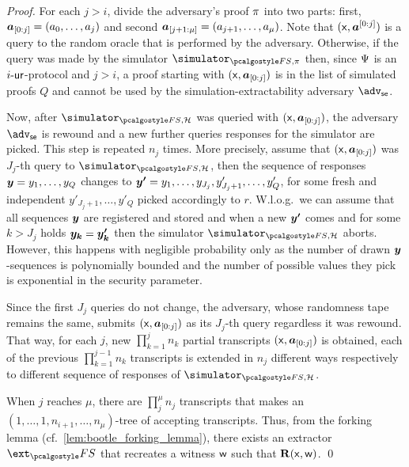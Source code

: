 \documentclass[runningheads,11pt]{llncs}
\let\spvec\vec
\let\vec\accentvec
\let\vec\spvec
\def\vec#1{\mathchoice{\mbox{\boldmath$\displaystyle#1$}}
	{\mbox{\boldmath$\textstyle#1$}}
	{\mbox{\boldmath$\scriptstyle#1$}}
	{\mbox{\boldmath$\scriptscriptstyle#1$}}}
\theoremstyle{definition}
\begin{document}
\begin{proof}
	For each $j > i$, divide the adversary's proof $\pi$ into two parts:
	first, $\vec{a}_{[0:j]} = (a_0, \ldots, a_j)$ and second $\vec{a}_{{[j + 1:\mu]}} = (a_{j + 1}, \ldots, a_\mu)$.
	Note that $(\inp, \vec{a}^{[0:j]})$ is a query to the random oracle that is performed by the adversary.
	Otherwise, if the query was made by the simulator $\simulator_{\fs, \zkproof}$ then, since $\mathrm{\Psi}$ is an ${i\text{-}\mathsf{ur}}$-protocol and $j > i$, a proof starting with $(\inp, \vec{a}_{[0:j]})$ is in the list of simulated proofs $Q$ and cannot be used by the simulation-extractability adversary $\adv_\se$.

	Now, after $\simulator_{\fs, \ro}$ was queried with $(\inp, \vec{a}_{[0:j]})$, the adversary $\adv_\se$ is rewound and a new further queries responses for the simulator are picked. This step is repeated $n_j$ times.
	More precisely, assume that $(\inp, \vec{a}_{[0:j]})$ was $J_j$-th query to $\simulator_{\fs, \ro}$, then the sequence of responses $\vec{y} = y_1, \ldots, y_Q$ changes to $\vec{y'} = y_1, \ldots, y_{J_j}, y'_{J_j + 1}, \ldots, y'_{Q}$, for some fresh and independent $y'_{J_j + 1}, \ldots, y'_{Q}$ picked accordingly to $r$.
	W.l.o.g.~we can assume that all sequences $\vec{y}$ are registered and stored and when a new $\vec{y'}$ comes and for some $k > J_j$ holds $\vec{y_k} = \vec{y'_k}$ then the simulator $\simulator_{\fs, \ro}$ aborts. However, this happens with negligible probability only as the number of drawn $\vec{y}$-sequences is polynomially bounded and the number of possible values they pick is exponential in the security parameter.

	Since the first $J_j$ queries do not change, the adversary, whose randomness tape remains the same, submits $(\inp, \vec{a}_{[0:j]})$ as its $J_j$-th query regardless it was rewound.
	That way, for each $j$, new $\prod_{k = 1}^{j} n_k$ partial transcripts $(\inp, \vec{a}_{[0 : j]})$ is obtained, each of the previous $\prod_{k = 1}^{j - 1} n_k$ transcripts is extended in $n_j$ different ways respectively to different sequence of responses of $\simulator_{\fs, \ro}$.

	When $j$ reaches $\mu$, there are $\prod_{j}^{\mu} n_j$ transcripts that makes an $(1, \ldots, 1, n_{i + 1}, \ldots, n_\mu)$-tree of accepting transcripts. Thus, from the forking lemma (cf.~\cref{lem:bootle_forking_lemma}), there exists an extractor $\ext_\fs$ that recreates a witness $\mathsf{w}$ such that $\mathbf{R}(\mathsf{x}, \mathsf{w})$.
	\qed
\end{proof}
\end{document}
